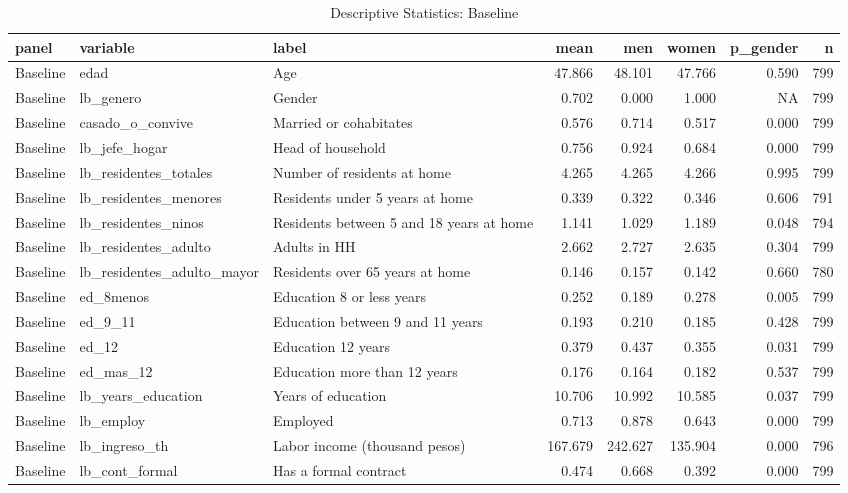 \begin{table}

\caption{Descriptive Statistics: Baseline}
\centering
\begin{tabular}[t]{lllrrrrr}
\toprule
panel & variable & label & mean & men & women & p\_gender & n\\
\midrule
Baseline & edad & Age & 47.866 & 48.101 & 47.766 & 0.590 & 799\\
Baseline & lb\_genero & Gender & 0.702 & 0.000 & 1.000 & NA & 799\\
Baseline & casado\_o\_convive & Married or cohabitates & 0.576 & 0.714 & 0.517 & 0.000 & 799\\
Baseline & lb\_jefe\_hogar & Head of household & 0.756 & 0.924 & 0.684 & 0.000 & 799\\
Baseline & lb\_residentes\_totales & Number of residents at home & 4.265 & 4.265 & 4.266 & 0.995 & 799\\
\addlinespace
Baseline & lb\_residentes\_menores & Residents under 5 years at home & 0.339 & 0.322 & 0.346 & 0.606 & 791\\
Baseline & lb\_residentes\_ninos & Residents between 5 and 18 years at home & 1.141 & 1.029 & 1.189 & 0.048 & 794\\
Baseline & lb\_residentes\_adulto & Adults in HH & 2.662 & 2.727 & 2.635 & 0.304 & 799\\
Baseline & lb\_residentes\_adulto\_mayor & Residents over 65 years at home & 0.146 & 0.157 & 0.142 & 0.660 & 780\\
Baseline & ed\_8menos & Education 8 or less years & 0.252 & 0.189 & 0.278 & 0.005 & 799\\
\addlinespace
Baseline & ed\_9\_11 & Education between 9 and 11 years & 0.193 & 0.210 & 0.185 & 0.428 & 799\\
Baseline & ed\_12 & Education 12 years & 0.379 & 0.437 & 0.355 & 0.031 & 799\\
Baseline & ed\_mas\_12 & Education more than 12 years & 0.176 & 0.164 & 0.182 & 0.537 & 799\\
Baseline & lb\_years\_education & Years of education & 10.706 & 10.992 & 10.585 & 0.037 & 799\\
Baseline & lb\_employ & Employed & 0.713 & 0.878 & 0.643 & 0.000 & 799\\
\addlinespace
Baseline & lb\_ingreso\_th & Labor income (thousand pesos) & 167.679 & 242.627 & 135.904 & 0.000 & 796\\
Baseline & lb\_cont\_formal & Has a formal contract & 0.474 & 0.668 & 0.392 & 0.000 & 799\\

\end{tabular}
\end{table}
